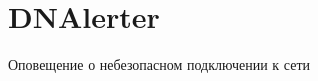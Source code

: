 \chapter{DNAlerter}
\label{md__r_e_a_d_m_e}
\label{md__r_e_a_d_m_e_autotoc_md0}%


Оповещение о небезопасном подключении к сети 
